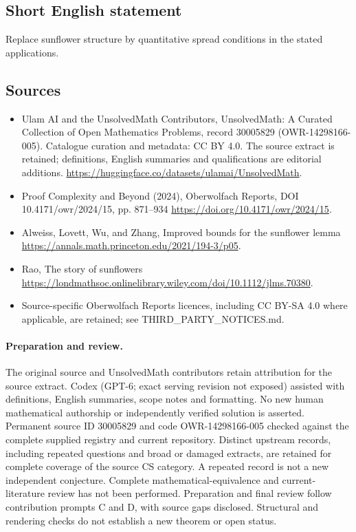 \documentclass[11pt]{article}
\begin{document}
\subsection{Short English statement}
Replace sunflower structure by quantitative spread conditions in the stated applications.
\subsection{Sources}
\begin{itemize}
\item[\hypertarget{source:30005829:1}{S1}] Ulam AI and the UnsolvedMath Contributors, UnsolvedMath: A Curated Collection of Open Mathematics Problems, record 30005829 (OWR-14298166-005). Catalogue curation and metadata: CC BY 4.0. The source extract is retained; definitions, English summaries and qualifications are editorial additions.
\url{https://huggingface.co/datasets/ulamai/UnsolvedMath}.
\item[\hypertarget{source:30005829:2}{S2}] Proof Complexity and Beyond (2024), Oberwolfach Reports, DOI 10.4171/owr/2024/15, pp. 871--934
\url{https://doi.org/10.4171/owr/2024/15}.
\item[\hypertarget{source:30005829:3}{S3}] Alweiss, Lovett, Wu, and Zhang, Improved bounds for the sunflower lemma
\url{https://annals.math.princeton.edu/2021/194-3/p05}.
\item[\hypertarget{source:30005829:4}{S4}] Rao, The story of sunflowers
\url{https://londmathsoc.onlinelibrary.wiley.com/doi/10.1112/jlms.70380}.
\item Source-specific Oberwolfach Reports licences, including CC BY-SA 4.0 where applicable, are retained; see THIRD\_PARTY\_NOTICES.md.
\end{itemize}
\paragraph{Preparation and review.}
The original source and UnsolvedMath contributors retain attribution for the source extract. Codex (GPT-6; exact serving revision not exposed) assisted with definitions, English summaries, scope notes and formatting. No new human mathematical authorship or independently verified solution is asserted. Permanent source ID 30005829 and code OWR-14298166-005 checked against the complete supplied registry and current repository. Distinct upstream records, including repeated questions and broad or damaged extracts, are retained for complete coverage of the source CS category. A repeated record is not a new independent conjecture. Complete mathematical-equivalence and current-literature review has not been performed. Preparation and final review follow contribution prompts C and D, with source gaps disclosed. Structural and rendering checks do not establish a new theorem or open status.
\label{end:30005829}
\end{document}
